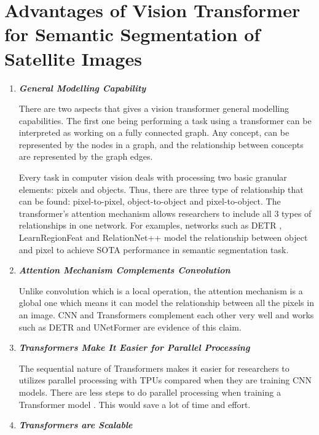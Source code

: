 \section{Advantages of Vision Transformer for Semantic Segmentation of Satellite Images}
\begin{enumerate}
    \item \textit{\textbf{General Modelling Capability}}
    
    There are two aspects that gives a vision transformer general modelling capabilities. The first one being performing a task using a transformer can be interpreted as working on a fully connected graph. Any concept, can be represented by the nodes in a graph, and the relationship between concepts are represented by the graph edges.

    Every task in computer vision deals with processing two basic granular elements: pixels and objects. Thus, there are three type of relationship that can be found: pixel-to-pixel, object-to-object and pixel-to-object. The transformer's attention mechanism allows researchers to include all 3 types of relationships in one network. For examples, networks such as DETR \cite{detr}, LearnRegionFeat \cite{learnregionfeat} and RelationNet++ \cite{regionnet++} model the relationship between object and pixel to achieve SOTA performance in semantic segmentation task.  

    \item \textit{\textbf{Attention Mechanism Complements Convolution}}

    Unlike convolution which is a local operation, the attention mechanism is a global one which means it can model the relationship between all the pixels in an image. CNN and Transformers complement each other very well and works such as DETR \cite{detr} and UNetFormer \cite{unetformer} are evidence of this claim.

    \item \textit{\textbf{Transformers Make It Easier for Parallel Processing}}

        The sequential nature of Transformers makes it easier for researchers to utilizes parallel processing with TPUs compared when they are training CNN models. There are less steps to do parallel processing when training a Transformer model \cite{swin-v1}. This would save a lot of time and effort.


    \item \textit{\textbf{Transformers are Scalable}}


\end{enumerate}

